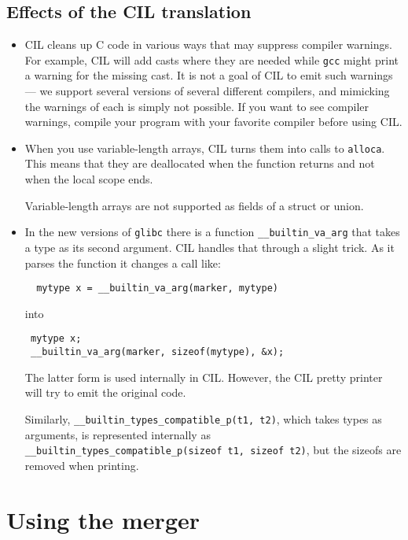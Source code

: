 \documentclass{article}
\def\t#1{{\tt #1}}
\begin{document}
\subsection{Effects of the CIL translation}
\begin{itemize}
\item CIL cleans up C code in various ways that may suppress compiler
  warnings.  For example, CIL will add casts where they are needed
  while \t{gcc} might print a warning for the missing cast.  It is
  not a goal of CIL to emit such warnings --- we support several
  versions of several different compilers, and mimicking the warnings
  of each is simply not possible.  If you want to see compiler
  warnings, compile your program with your favorite compiler before
  using CIL.

\item When you use variable-length arrays, CIL turns them into calls
  to \t{alloca}. This means that they are deallocated when the
  function returns and not when the local scope ends.

  Variable-length arrays are not supported as fields of a struct or union.

\item In the new versions of \t{glibc} there is a function
  \t{\_\_builtin\_va\_arg} that takes a type as its second argument. CIL
  handles that through a slight trick. As it parses the function it changes a
  call like:
\begin{verbatim}
  mytype x = __builtin_va_arg(marker, mytype)
\end{verbatim}
 into 
\begin{verbatim}
 mytype x;
 __builtin_va_arg(marker, sizeof(mytype), &x);
\end{verbatim}

 The latter form is used internally in CIL. However, the CIL pretty printer
 will try to emit the original code. 

 Similarly, \t{\_\_builtin\_types\_compatible\_p(t1, t2)}, which takes
 types as arguments, is represented internally as
 \t{\_\_builtin\_types\_compatible\_p(sizeof t1, sizeof t2)}, but the
 sizeofs are removed when printing.

\end{itemize}





  \section{Using the merger}\label{sec-merger}
\end{document}
